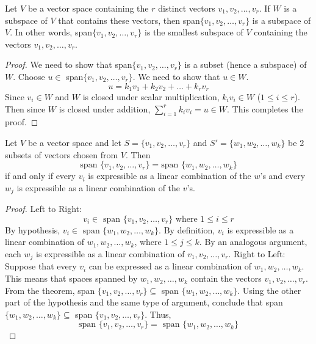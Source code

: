 \documentclass[12pt]{article}
\begin{document}
\begin{theorem} Let $V$ be a vector space containing the $r$ distinct vectors $v_1, v_2, \dots, v_r$. If $W$ is a subspace of $V$ that contains these vectors, then span$\{v_1, v_2, \dots, v_r\}$ is a subspace of $V$. In other words, span$\{v_1, v_2, \dots, v_r\}$ is the smallest subspace of $V$ containing the vectors $v_1, v_2, \dots, v_r$. \end{theorem} \begin{proof} We need to show that span$\{v_1, v_2, \dots, v_r\}$ is a subset (hence a subspace) of $W$. Choose $ u \in $ span$\{v_1, v_2, \dots, v_r\}$. We need to show that $u \in W$. $$u = k_1v_1 + k_2v_2 + \dots + k_rv_r $$ Since $v_i \in W$ and $W$ is closed under scalar multiplication, $ k_iv_i \in W$ ($1 \leq i \leq r$). Then since $W$ is closed under addition, $\sum_{i = 1}^r k_iv_i = u \in W$. This completes the proof. \end{proof}
\begin{theorem} Let $V$ be a vector space and let $S = \{ v_1, v_2, \dots, v_r\}$ and $S' = \{w_1, w_2, \dots, w_k\}$ be 2 subsets of vectors chosen from $V$. Then $$ \text{span } \{v_1, v_2, \dots, v_r\} = \text{span } \{w_1, w_2, \dots, w_k\} $$ if and only if every $v_i$ is expressible as a linear combination of the $w$'s and every $w_j$ is expressible as a linear combination of the $v$'s. \end{theorem} \begin{proof} Left to Right: $$ v_i \in \text{ span }\{v_1, v_2, \dots, v_r\} \text{ where } 1 \leq i \leq r $$ By hypothesis, $v_i \in \text{ span }\{w_1, w_2, \dots, w_k\}$. By definition, $v_i$ is expressible as a linear combination of $w_1, w_2, \dots, w_k$, where $1 \leq j \leq k$. By an analogous argument, each $w_j$ is expressible as a linear combination of $v_1, v_2, \dots, v_r$. \newline Right to Left: Suppose that every $v_i$ can be expressed as a linear combination of $w_1, w_2, \dots, w_k$. This means that spaces spanned by $w_1, w_2, \dots, w_k$ contain the vectors $v_1, v_2, \dots, v_r$. From the theorem, span $\{v_1, v_2, \dots, v_r\} \subseteq $ span $\{w_1, w_2, \dots, w_k\}$. Using the other part of the hypothesis and the same type of argument, conclude that span $\{w_1, w_2, \dots, w_k\} \subseteq $ span $\{v_1, v_2, \dots, v_r\}$. \newline Thus, $$ \text{span } \{v_1, v_2, \dots, v_r\} = \text{ span }\{w_1, w_2, \dots, w_k\} $$ \end{proof}
\end{document}
